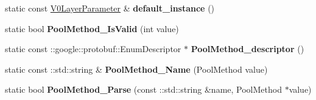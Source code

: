 \begin{DoxyCompactItemize}
static const \mbox{\hyperlink{classcaffe_1_1_v0_layer_parameter}{V0\+Layer\+Parameter}} \& {\bfseries default\+\_\+instance} ()
\item 
\mbox{\label{classcaffe_1_1_v0_layer_parameter_a21b74ae3eb9be456da31feddf0d93657}} 
static bool {\bfseries Pool\+Method\+\_\+\+Is\+Valid} (int value)
\item 
\mbox{\label{classcaffe_1_1_v0_layer_parameter_a53311f643d2753e1aed4aa11ec0709a0}} 
static const \+::google\+::protobuf\+::\+Enum\+Descriptor $\ast$ {\bfseries Pool\+Method\+\_\+descriptor} ()
\item 
\mbox{\label{classcaffe_1_1_v0_layer_parameter_a63113f83ad300e33bad58a3fd5756bd8}} 
static const \+::std\+::string \& {\bfseries Pool\+Method\+\_\+\+Name} (Pool\+Method value)
\item 
\mbox{\label{classcaffe_1_1_v0_layer_parameter_ae6fb40ea59964e2641fa029147feb2b5}} 
static bool {\bfseries Pool\+Method\+\_\+\+Parse} (const \+::std\+::string \&name, Pool\+Method $\ast$value)
\end{DoxyCompactItemize}

